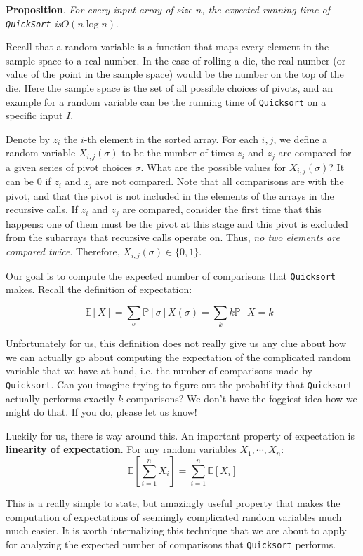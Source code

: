 \documentclass [12pt]{article}
\begin{document}
\textbf{Proposition}. \textit{For every input array of size $n$, the expected running time of \texttt{QuickSort} is$O(n \log n)$}.

Recall that a random variable is a function that maps every element in the sample space to a real number. In the case of rolling a die, the real number (or value of the point in the sample space) would be the number on the top of the die. Here the sample space is the set of all possible choices of pivots, and an example for a random variable can be the running time of \texttt{Quicksort} on a specific input $I$.

Denote by $z_i$ the $i$-th element in the sorted array. For each $i, j$, we define a random variable $X_{i ,j} (\sigma)$ to be the number of times $z_i$ and $z_j$ are compared for a given series of pivot choices $\sigma$. What are the possible values for $X_{i ,j} (\sigma)$? It can be $0$ if $z_i$ and $z_j$ are not compared. Note that all comparisons are with the pivot, and that the pivot is not included in the elements of the arrays in the recursive calls. If $z_i$ and $z_j$ are compared, consider the first time that this happens: one of them must be the pivot at this stage and this pivot is excluded from the subarrays that recursive calls operate on. Thus, \textit{no two elements are compared twice}. Therefore, $X_{i ,j} (\sigma) \in \{0, 1\}$. 

Our goal is to compute the expected number of comparisons that \texttt{Quicksort} makes. Recall the definition of expectation:

$$
\mathbb{E}[X] = \sum_{\sigma} \mathbb{P}[\sigma]X(\sigma) = \sum_{k} k\mathbb{P}[X = k]
$$

Unfortunately for us, this definition does not really give us any clue about how we can actually go about computing the expectation of the complicated random variable that we have at hand, i.e. the number of comparisons made by \texttt{Quicksort}. Can you imagine trying to figure out the probability that \texttt{Quicksort} actually performs exactly $k$ comparisons? We don’t have the foggiest idea how we might do that. If you do, please let us know!

Luckily for us, there is way around this. An important property of expectation is \textbf{linearity of expectation}. For any random variables $X_1, \cdots, X_n$:
$$
\mathbb{E}\left[\sum_{i=1}^n X_i \right] = \sum_{i=1}^n \mathbb{E}[X_i]
$$

This is a really simple to state, but amazingly useful property that makes the computation of expectations of seemingly complicated random variables much much easier. It is worth internalizing this technique that we are about to apply for analyzing the expected number of comparisons that \texttt{Quicksort} performs.
\end{document}
